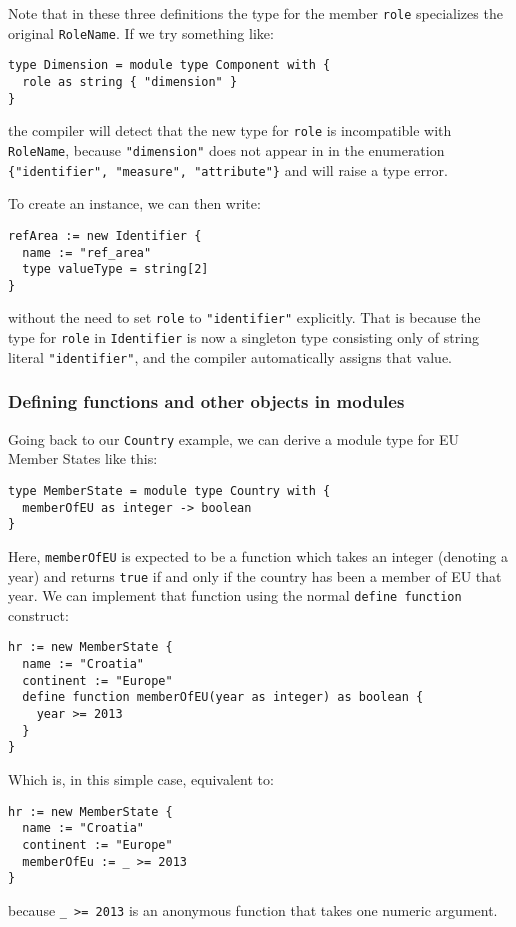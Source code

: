 \documentclass[droidmono,libertine,twoside,user,unofficial]{ecarticle}
\begin{document}
Note that in these three definitions the type for the member
\texttt{role} specializes the original \texttt{RoleName}.  If we try
something like:
\begin{lstlisting}
type Dimension = module type Component with {
  role as string { "dimension" }
}
\end{lstlisting}
the compiler will detect that the new type for \texttt{role} is
incompatible with \texttt{RoleName}, because \texttt{"dimension"} does
not appear in in the enumeration \texttt{\{"identifier", "measure",
  "attribute"\}} and will raise a type error.

To create an instance, we can then write:
\begin{lstlisting}
refArea := new Identifier {
  name := "ref_area"
  type valueType = string[2]
}
\end{lstlisting}
without the need to set \texttt{role} to \texttt{"identifier"}
explicitly.  That is because the type for \texttt{role} in
\texttt{Identifier} is now a singleton type consisting only of string
literal \texttt{"identifier"}, and the compiler automatically assigns
that value.

\subsubsection*{Defining functions and other objects in modules}

Going back to our \texttt{Country} example, we can derive a module
type for EU Member States like this:
\begin{lstlisting}
type MemberState = module type Country with {
  memberOfEU as integer -> boolean
}
\end{lstlisting}

Here, \texttt{memberOfEU} is expected to be a function which takes an
integer (denoting a year) and returns \texttt{true} if and only if the
country has been a member of EU that year.  We can implement that
function using the normal \texttt{define function} construct:
\begin{lstlisting}
hr := new MemberState {
  name := "Croatia"
  continent := "Europe"
  define function memberOfEU(year as integer) as boolean {
    year >= 2013
  }
}
\end{lstlisting}
Which is, in this simple case, equivalent to:
\begin{lstlisting}
hr := new MemberState {
  name := "Croatia"
  continent := "Europe"
  memberOfEu := _ >= 2013
}
\end{lstlisting}
because \texttt{\_ >= 2013} is an anonymous function that takes one
numeric argument.
\end{document}
